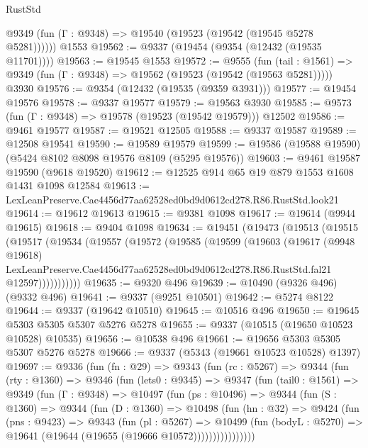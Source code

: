 \begin{lexlean}{RustStd}
\begin{coremodule}
      @9349 (fun (Γ : @9348) => @19540 (@19523 (@19542 (@19545 @5278 @5281))))))
    @1553
@19562 := @9337 (@19454 (@9354 (@12432 (@19535 @11701))))
@19563 := @19545 @1553
@19572 := @9555
    (fun (tail : @1561) => @9349 (fun (Γ : @9348) => @19562 (@19523 (@19542 (@19563 @5281)))))
    @3930
@19576 := @9354 (@12432 (@19535 (@9359 @3931)))
@19577 := @19454 @19576
@19578 := @9337 @19577
@19579 := @19563 @3930
@19585 := @9573 (fun (Γ : @9348) => @19578 (@19523 (@19542 @19579))) @12502
@19586 := @9461 @19577
@19587 := @19521 @12505
@19588 := @9337 @19587
@19589 := @12508 @19541
@19590 := @19589 @19579
@19599 := @19586 (@19588 @19590) (@5424 @8102 @8098 @19576 @8109 (@5295 @19576))
@19603 := @9461 @19587 @19590 (@9618 @19520)
@19612 := @12525 @914 @65 @19 @879 @1553 @1608 @1431 @1098 @12584
@19613 := LexLeanPreserve.Cae4456d77aa62528ed0bd9d0612cd278.R86.RustStd.look21
@19614 := @19612 @19613
@19615 := @9381 @1098
@19617 := @19614 (@9944 @19615)
@19618 := @9404 @1098
@19634 := @19451
    (@19473
      (@19513
        (@19515
          (@19517
            (@19534
              (@19557
                (@19572
                  (@19585
                    (@19599
                      (@19603
                        (@19617
                          (@9948 @19618)
                          LexLeanPreserve.Cae4456d77aa62528ed0bd9d0612cd278.R86.RustStd.fal21
                          @12597)))))))))))
@19635 := @9320 @496
@19639 := @10490 (@9326 @496) (@9332 @496)
@19641 := @9337 (@9251 @10501)
@19642 := @5274 @8122
@19644 := @9337 (@19642 @10510)
@19645 := @10516 @496
@19650 := @19645 @5303 @5305 @5307 @5276 @5278
@19655 := @9337 (@10515 (@19650 @10523 @10528) @10535)
@19656 := @10538 @496
@19661 := @19656 @5303 @5305 @5307 @5276 @5278
@19666 := @9337 (@5343 (@19661 @10523 @10528) @1397)
@19697 := @9336
    (fun (fn : @29) =>
    @9343
      (fun (rc : @5267) =>
      @9344
        (fun (rty : @1360) =>
        @9346
          (fun (lets0 : @9345) =>
          @9347
            (fun (tail0 : @1561) =>
            @9349
              (fun (Γ : @9348) =>
              @10497
                (fun (ps : @10496) =>
                @9344
                  (fun (S : @1360) =>
                  @9344
                    (fun (D : @1360) =>
                    @10498
                      (fun (hn : @32) =>
                      @9424
                        (fun (pns : @9423) =>
                        @9343
                          (fun (pl : @5267) =>
                          @10499
                            (fun (bodyL : @5270) =>
                            @19641 (@19644 (@19655 (@19666 @10572))))))))))))))))

\end{coremodule}
\end{lexlean}
